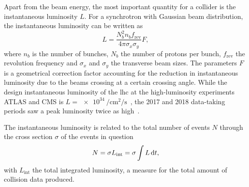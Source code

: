 Apart from the beam energy, the most important quantity for a collider is the instantaneous luminosity $L$. For a synchrotron with Gaussian beam distribution, the instantaneous luminosity can be written as
\begin{equation}
	L = \frac{N_b^2 n_b f_\mathrm{rev}}{4\pi\sigma_x\sigma_y} F,
	\label{eq:lumi}
\end{equation}
where $n_b$ is the number of bunches, $N_b$ the number of protons per bunch, $f_\mathrm{rev}$ the revolution frequency and $\sigma_x$ and $\sigma_y$ the transverse beam sizes. The parameters $F$ is a geometrical correction factor accounting for the reduction in instantaneous luminosity due to the beams crossing at a certain crossing angle. While the design instantaneous luminosity of the \gls{lhc} at the high-luminosity experiments ATLAS and CMS is $L = \SI{e34}{\per\cm\squared\per\second}$~\cite{Evans:1129806}, the 2017 and 2018 data-taking periods saw a peak luminosity twice as high~\cite{peak_lumi}.

The instantaneous luminosity is related to the total number of events $N$ through the cross section $\sigma$ of the events in question
\begin{equation}
	N = \sigma L_\mathrm{int} = \sigma \int L\mathop{}\!\mathrm{d} t,
\end{equation}
with $L_\mathrm{int}$ the total integrated luminosity, a measure for the total amount of collision data produced.

